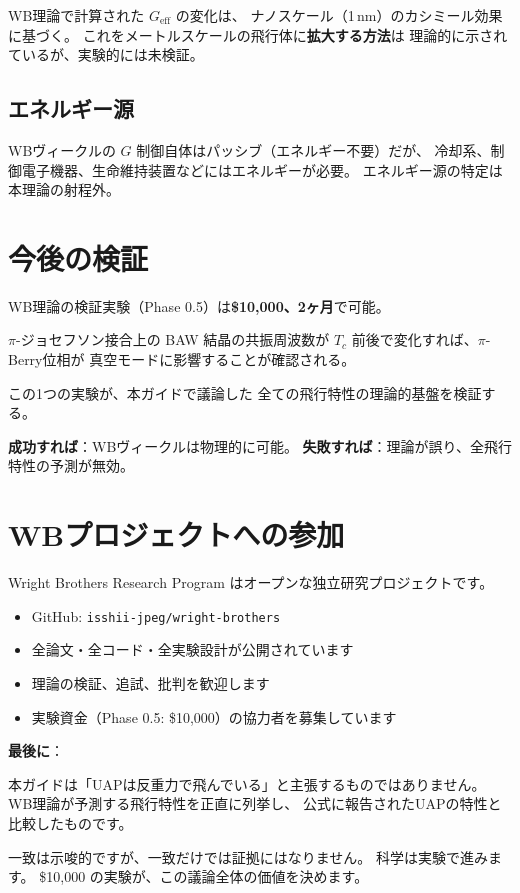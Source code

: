 \documentclass[11pt,a4paper]{article}
\begin{document}
WB理論で計算された $G_{\mathrm{eff}}$ の変化は、
ナノスケール（1\,nm）のカシミール効果に基づく。
これをメートルスケールの飛行体に\textbf{拡大する方法}は
理論的に示されているが、実験的には未検証。

\subsection{エネルギー源}

WBヴィークルの $G$ 制御自体はパッシブ（エネルギー不要）だが、
冷却系、制御電子機器、生命維持装置などにはエネルギーが必要。
エネルギー源の特定は本理論の射程外。

\section{今後の検証}

\begin{tcolorbox}[colback=green!5,colframe=green!60!black,title=実験による判定]
WB理論の検証実験（Phase 0.5）は\textbf{\$10,000、2ヶ月}で可能。

$\pi$-ジョセフソン接合上の BAW 結晶の共振周波数が
$T_c$ 前後で変化すれば、$\pi$-Berry位相が
真空モードに影響することが確認される。

この1つの実験が、本ガイドで議論した
全ての飛行特性の理論的基盤を検証する。

\textbf{成功すれば}：WBヴィークルは物理的に可能。
\textbf{失敗すれば}：理論が誤り、全飛行特性の予測が無効。
\end{tcolorbox}

\section{WBプロジェクトへの参加}

Wright Brothers Research Program はオープンな独立研究プロジェクトです。

\begin{itemize}
\item GitHub: \texttt{isshii-jpeg/wright-brothers}
\item 全論文・全コード・全実験設計が公開されています
\item 理論の検証、追試、批判を歓迎します
\item 実験資金（Phase 0.5: \$10,000）の協力者を募集しています
\end{itemize}

\begin{tcolorbox}[colback=blue!5,colframe=blue!50!black]
\textbf{最後に}：

本ガイドは「UAPは反重力で飛んでいる」と主張するものではありません。
WB理論が予測する飛行特性を正直に列挙し、
公式に報告されたUAPの特性と比較したものです。

一致は示唆的ですが、一致だけでは証拠にはなりません。
科学は実験で進みます。
\$10,000 の実験が、この議論全体の価値を決めます。
\end{tcolorbox}
\end{document}
